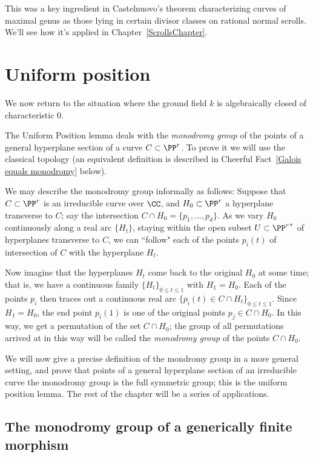 This was a key ingredient in Castelnuovo's theorem characterizing curves of maximal genus as
those lying in certain divisor classes on rational normal scrolls.
We'll see how it's applied in Chapter~\ref{ScrollsChapter}.

\section{Uniform position} \label{uniformSection}
We now return to the situation where the ground field $k$ is algebraically closed of characteristic 0.

The Uniform Position lemma deals with the \emph{monodromy group} of the points of a general hyperplane section of a curve $C \subset \PP^r$. To prove it we will use the classical topology (an equivalent definition is described in Cheerful Fact~\ref{Galois equals monodromy} below). 

We may describe the monodromy group informally as follows: Suppose that $C \subset \PP^r$ is an irreducible curve over $\CC$, and $H_0 \subset \PP^r$ a hyperplane transverse to $C$; say the intersection $C \cap H_0 = \{p_1,\dots,p_d\}$. As we vary $H_0$ continuously along a real arc $\{H_t\}$, staying within the open subset $U \subset {\PP^r}^*$ of hyperplanes transverse to $C$, we can ``follow" each of the points $p_i(t)$ of intersection of $C$ with the hyperplane $H_t$.

Now imagine that the hyperplanes $H_t$ come back to the original $H_0$ at some time; that is, we have a continuous family $\{H_t\}_{0 \leq t \leq 1}$ with $H_1 = H_0$. Each of the points $p_i$ then traces out a continuous real arc 
$\{p_i(t) \in C \cap H_t\}_{0 \leq t \leq 1}$. Since $H_1 = H_0$, the end point $p_i(1)$ is one of the original points $p_j \in C \cap H_0$. In this way, we get a permutation of the set $C \cap H_0$; the group of all permutations arrived at in this way will be called the \emph{monodromy group} of the points $C \cap H_0$. 

We will now give a precise definition of the mondromy group in a more general setting, and prove that points of a general hyperplane section of an irreducible curve
the monodromy group is the full symmetric group; this is the uniform position lemma. The rest of the chapter will be a series of applications.

\subsection{The monodromy group of a generically finite morphism}

